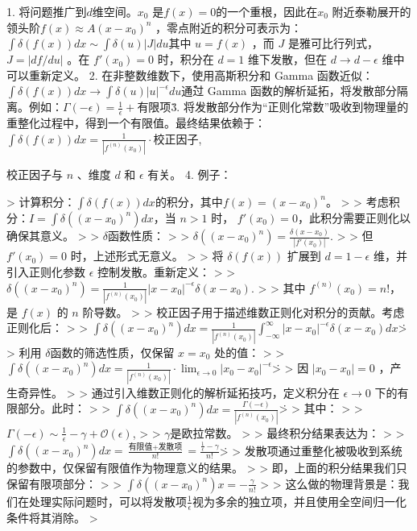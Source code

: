 \documentclass[lang=cn,10pt,newtx,bibend=biber,device=pad]{elegantbook}
\begin{document}
    1. 将问题推广到$d$维空间。$x_0$ 是$f(x) = 0$的一个重根，因此在$x_0$ 附近泰勒展开的领头阶$f(x) \approx  A(x-x_0)^n$ ，零点附近的积分可表示为：$\int \delta(f(x)) dx \sim \int \delta(u) |J| du$其中  $u = f(x)$ ，而  $J$  是雅可比行列式， $J = |df/du|$ 。在  $f{\prime}(x_0) = 0$  时，积分在  $d=1$  维下发散，但在  $d \to d-\epsilon$  维中可以重新定义。
    2. 在非整数维数下，使用高斯积分和 Gamma 函数近似：$\int \delta(f(x)) dx \to \int \delta(u) |u|^{-\epsilon} du$\.通过 Gamma 函数的解析延拓，将发散部分隔离。例如：$\Gamma(-\epsilon) = \frac{1}{\epsilon} + \text{有限项}$\.
    3. 将发散部分作为“正则化常数”吸收到物理量的重整化过程中，得到一个有限值。最终结果依赖于：$\int \delta(f(x)) dx = \frac{1}{|f^{(n)}(x_0)|} \cdot \text{校正因子}$,

        校正因子与  $n$ 、维度  $d$  和  $\epsilon$  有关。
    4. 例子：

        > 计算积分：$\int \delta(f(x))dx$的积分，其中$f(x) = (x-x_0)^n$。
        >
        > 考虑积分：$ I = \int \delta((x - x_0)^n) dx $，当  $n > 1$  时， $f{\prime}(x_0) = 0$，此积分需要正则化以确保其意义。
        >
        > $\delta$函数性质：
        >
        > $\delta((x - x_0)^n) = \frac{\delta(x - x_0)}{|f{\prime}(x_0)|}.$
        >
        > 但  $f{\prime}(x_0) = 0$  时，上述形式无意义。
        >
        > 将  $\delta(f(x))$  扩展到  $d = 1 - \epsilon$  维，并引入正则化参数  $\epsilon$  控制发散。重新定义：
        >
        > $\delta((x - x_0)^n) = \frac{1}{|f^{(n)}(x_0)|} |x - x_0|^{-\epsilon} \delta(x - x_0).$
        >
        > 其中  $f^{(n)}(x_0) = n!$，是  $f(x)$  的  $n$  阶导数。
        >
        > 校正因子用于描述维数正则化对积分的贡献。考虑正则化后：
        >
        > $\int \delta((x - x_0)^n) dx = \frac{1}{|f^{(n)}(x_0)|} \int_{-\infty}^\infty |x - x_0|^{-\epsilon} \delta(x - x_0) dx$\.
        >
        > 利用 $\delta$函数的筛选性质，仅保留  $x = x_0$  处的值：
        >
        > $\int \delta((x - x_0)^n) dx = \frac{1}{|f^{(n)}(x_0)|} \cdot \lim_{\epsilon \to 0} |x_0 - x_0|^{-\epsilon}$\.
        >
        > 因  $|x_0 - x_0| = 0$ ，产生奇异性。
        >
        > 通过引入维数正则化的解析延拓技巧，定义积分在  $\epsilon \to 0$  下的有限部分。此时：
        >
        > $\int \delta((x - x_0)^n) dx = \frac{\Gamma(-\epsilon)}{|f^{(n)}(x_0)|}$\.
        >
        > 其中：
        >
        > $\Gamma(-\epsilon) \sim \frac{1}{\epsilon} - \gamma + \mathcal{O}(\epsilon)$,
        >
        > $\gamma$是欧拉常数。
        >
        > 最终积分结果表达为：
        >
        > $\int \delta((x - x_0)^n) dx = \frac{\text{有限值} + \text{发散项}}{n!}=\frac{\frac{1}{\epsilon} - \gamma}{n!}$\.
        >
        > 发散项通过重整化被吸收到系统的参数中，仅保留有限值作为物理意义的结果。
        >
        > 即，上面的积分结果我们只保留有限项部分：
        >
        > $\int \delta((x-x_0)^n)x = -\frac{\gamma}{n!}$
        >
        > 这么做的物理背景是：我们在处理实际问题时，可以将发散项$\frac{1}{\epsilon}$视为多余的独立项，并且使用全空间归一化条件将其消除。
        >
\end{document}
